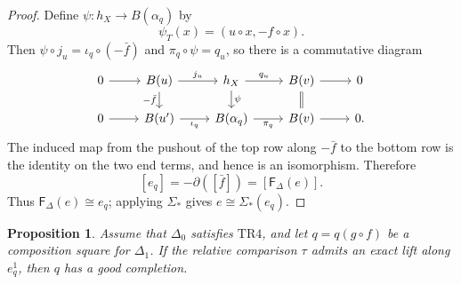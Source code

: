 \documentclass[a4paper,11pt,reqno]{amsart}
\newtheorem{proposition}[proposition]{Proposition}
\theoremstyle{definition}
\theoremstyle{plain}
\numberwithin{equation}{section}
\begin{document}
\begin{proof}
Define \(\psi:h_X\to B(\alpha_q)\) by
\[
 \psi_T(x)=(u\circ x,-f\circ x).
\]
Then \(\psi\circ j_u=\iota_q\circ(-\bar f)\) and
\(\pi_q\circ\psi=q_u\), so there is a commutative diagram
\[
\begin{tikzcd}[column sep=2.4em,row sep=1.35em]
0\arrow[r]&B(u)\arrow[r,"j_u"]\arrow[d,"-\bar f"']&
 h_X\arrow[r,"q_u"]\arrow[d,"\psi"]&
 B(v)\arrow[r]\arrow[d,equal]&0\\
0\arrow[r]&B(u')\arrow[r,"\iota_q"']&
 B(\alpha_q)\arrow[r,"\pi_q"']&B(v)\arrow[r]&0.
\end{tikzcd}
\]
The induced map from the pushout of the top row along \(-\bar f\) to the
bottom row is the identity on the two end terms, and hence is an isomorphism.
Therefore
\[
 [e_q]=-\partial([\bar f])=[\mathsf F_\Delta(e)].
\]
Thus \(\mathsf F_\Delta(e)\cong e_q\); applying \(\Sigma_*\) gives
\(e\cong\Sigma_*(e_q)\).
\end{proof}

\begin{proposition}
\label{prop:exact-lift-kills-obstruction}
Assume that \(\Delta_0\) satisfies \(\mathrm{TR4}\), and let
\(q=q(g\circ f)\) be a composition square for \(\Delta_1\).  If the relative
comparison \(\tau\) admits an exact lift along \(e_q^1\), then \(q\) has a
good completion.
\end{proposition}
\end{document}
